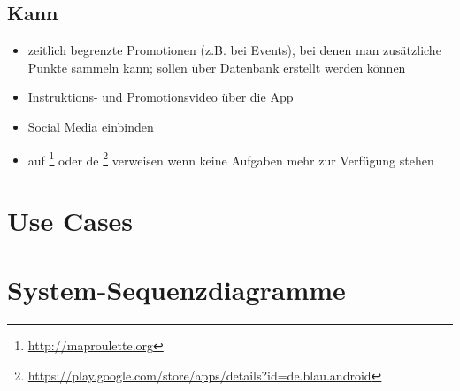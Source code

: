 \subsection{Kann}
\begin{itemize}
	\item zeitlich begrenzte Promotionen (z.B. bei Events), bei denen man zusätzliche Punkte sammeln kann; sollen über Datenbank erstellt werden können
	\item Instruktions- und Promotionsvideo über die App
	\item Social Media einbinden
	\item auf \footnote{\url{http://maproulette.org}} oder de \footnote{\url{https://play.google.com/store/apps/details?id=de.blau.android}} verweisen wenn keine Aufgaben mehr zur Verfügung stehen
\end{itemize}


\section{Use Cases}


\section{System-Sequenzdiagramme}


